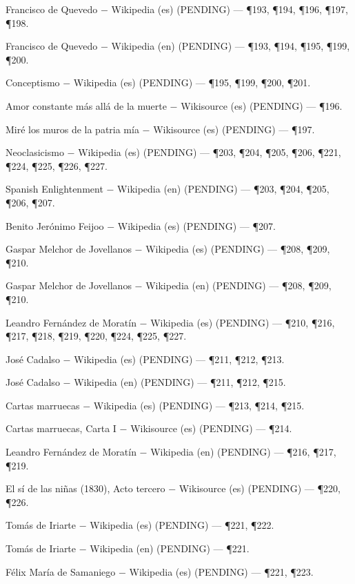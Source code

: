 \documentclass{book}
\begin{document}
\noindent Francisco de Quevedo \(-\) Wikipedia (es) (PENDING) --- \P193, \P194, \P196, \P197, \P198.

\noindent Francisco de Quevedo \(-\) Wikipedia (en) (PENDING) --- \P193, \P194, \P195, \P199, \P200.

\noindent Conceptismo \(-\) Wikipedia (es) (PENDING) --- \P195, \P199, \P200, \P201.

\noindent Amor constante más allá de la muerte \(-\) Wikisource (es) (PENDING) --- \P196.

\noindent Miré los muros de la patria mía \(-\) Wikisource (es) (PENDING) --- \P197.

\noindent Neoclasicismo \(-\) Wikipedia (es) (PENDING) --- \P203, \P204, \P205, \P206, \P221, \P224, \P225, \P226, \P227.

\noindent Spanish Enlightenment \(-\) Wikipedia (en) (PENDING) --- \P203, \P204, \P205, \P206, \P207.

\noindent Benito Jerónimo Feijoo \(-\) Wikipedia (es) (PENDING) --- \P207.

\noindent Gaspar Melchor de Jovellanos \(-\) Wikipedia (es) (PENDING) --- \P208, \P209, \P210.

\noindent Gaspar Melchor de Jovellanos \(-\) Wikipedia (en) (PENDING) --- \P208, \P209, \P210.

\noindent Leandro Fernández de Moratín \(-\) Wikipedia (es) (PENDING) --- \P210, \P216, \P217, \P218, \P219, \P220, \P224, \P225, \P227.

\noindent José Cadalso \(-\) Wikipedia (es) (PENDING) --- \P211, \P212, \P213.

\noindent José Cadalso \(-\) Wikipedia (en) (PENDING) --- \P211, \P212, \P215.

\noindent Cartas marruecas \(-\) Wikipedia (es) (PENDING) --- \P213, \P214, \P215.

\noindent Cartas marruecas, Carta I \(-\) Wikisource (es) (PENDING) --- \P214.

\noindent Leandro Fernández de Moratín \(-\) Wikipedia (en) (PENDING) --- \P216, \P217, \P219.

\noindent El sí de las niñas (1830), Acto tercero \(-\) Wikisource (es) (PENDING) --- \P220, \P226.

\noindent Tomás de Iriarte \(-\) Wikipedia (es) (PENDING) --- \P221, \P222.

\noindent Tomás de Iriarte \(-\) Wikipedia (en) (PENDING) --- \P221.

\noindent Félix María de Samaniego \(-\) Wikipedia (es) (PENDING) --- \P221, \P223.
\end{document}
